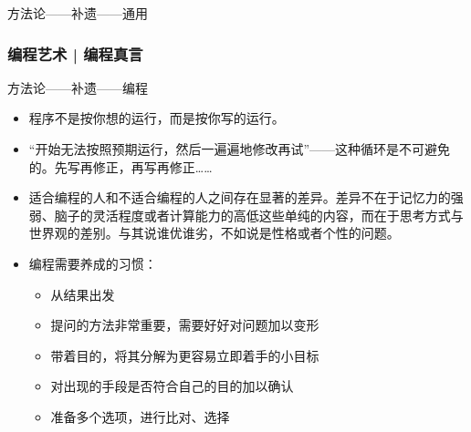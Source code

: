 \begin{frame}
\begin{block}{方法论——补遗——通用}
\begin{itemize}
    \end{itemize}
  \end{block}
\end{frame}

\begin{frame}
  \frametitle{编程艺术 | 编程真言}
  \begin{block}{方法论——补遗——编程}
    \begin{itemize}
      \item 程序不是按你想的运行，而是\alert{按你写的运行}。
      \item “开始无法按照预期运行，然后一遍遍地修改再试”——这种循环是不可避免的。先写再修正，再写再修正……
      \item 适合编程的人和不适合编程的人之间存在显著的差异。差异不在于记忆力的强弱、脑子的灵活程度或者计算能力的高低这些单纯的内容，而在于思考方式与世界观的差别。与其说谁优谁劣，不如说是\alert{性格或者个性}的问题。
      \item 编程需要养成的\alert{习惯}：
        \begin{itemize}
          \item 从结果出发
          \item 提问的方法非常重要，需要好好对问题加以变形
          \item 带着目的，将其分解为更容易立即着手的小目标
          \item 对出现的手段是否符合自己的目的加以确认
          \item 准备多个选项，进行比对、选择
        \end{itemize}
    \end{itemize}
  \end{block}
\end{frame}

